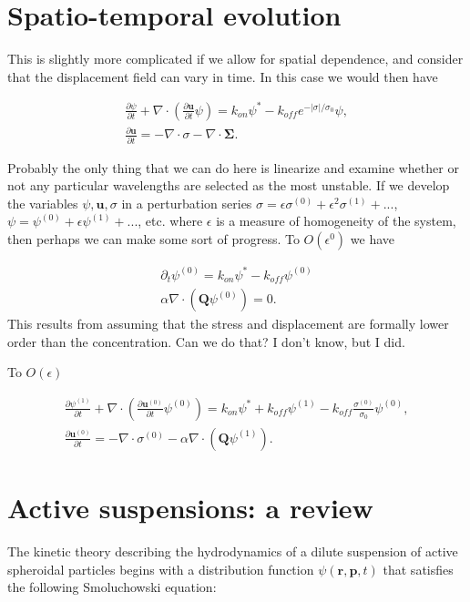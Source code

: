 \documentclass[onecolumn,showpacs,preprintnumbers,prl,amsmath,amssymb]{revtex4-1}
\def\b{\mathbf}
\begin{document}
\section{Spatio-temporal evolution}

This is slightly more complicated if we allow for spatial dependence, and consider that the displacement field can vary in time. In this case we would then have

\begin{gather}
\frac{\partial \psi}{\partial t}+\nabla\cdot\left(\frac{\partial\b{u}}{\partial t}\psi\right)=k_{on}\psi^{*}-k_{off}e^{-|\sigma|/\sigma_0}\psi,\\
\frac{\partial \b{u}}{\partial t}=-\nabla\cdot\sigma-\nabla\cdot\b{\Sigma}.
\end{gather}

Probably the only thing that we can do here is linearize and examine whether or not any particular wavelengths are selected as the most unstable. If we develop the variables $\psi, \b{u}, \sigma $ in a perturbation series $\sigma=\epsilon\sigma^{(0)}+\epsilon^2\sigma^{(1)}+...$, $\psi=\psi^{(0)}+\epsilon\psi^{(1)}+...$, etc. where $\epsilon$ is a measure of homogeneity of the system, then perhaps we can make some sort of progress. To $O(\epsilon^0)$ we have

\begin{gather}
\partial_t\psi^{(0)}=k_{on}\psi^*-k_{off}\psi^{(0)}\\
\alpha\nabla\cdot(\b{Q}\psi^{(0)})=0.
\end{gather}
This results from assuming that the stress and displacement are formally lower order than the concentration. Can we do that? I don't know, but I did.

To $O(\epsilon)$

\begin{gather}
\frac{\partial \psi^{(1)}}{\partial t}+\nabla\cdot\left(\frac{\partial\b{u}^{(0)}}{\partial t}\psi^{(0)}\right)=k_{on}\psi^{*}+k_{off}\psi^{(1)}-k_{off}\frac{\sigma^{(0)}}{\sigma_0}\psi^{(0)},\\
\frac{\partial \b{u}^{(0)}}{\partial t}=-\nabla\cdot\sigma^{(0)}-\alpha\nabla\cdot\left(\b{Q}\psi^{(1)}\right).
\end{gather}


\section{Active suspensions: a review}

The kinetic theory describing the hydrodynamics of a dilute suspension of active spheroidal particles begins with a distribution function $\psi(\b{r},\b{p},t)$ that satisfies the following Smoluchowski equation:
\end{document}

